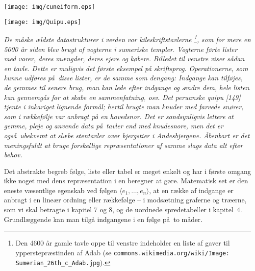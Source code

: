 \vspace*{-2.5cm}
\begin{minipage}{0.5\textwidth}
\begin{flushleft}
  \texttt{[image: img/cuneiform.eps]}
\end{flushleft}
\end{minipage}
\begin{minipage}{0.5\textwidth}
\begin{flushright}
\texttt{[image: img/Quipu.eps]} 
\end{flushright}
\end{minipage}
\vspace*{0.5cm}

\noindent
\emph{De måske ældste datastrukturer i verden var kileskriftstavlerne%
\footnote{%
Den 4600 år gamle tavle oppe til venstre indeholder en liste af gaver til ypperstepræstinden af Adab (se \texttt{commons.wikimedia.org/wiki/Image: Sumerian\_26th\_c\_Adab.jpg}).
},
som for mere en 5000 år siden blev brugt af vogterne i sumeriske templer.
Vogterne førte lister med varer, deres mængder, deres ejere og købere.
Billedet til venstre viser sådan en tavle.
Dette er muligvis det første eksempel på skriftsprog.
Operationerne, som kunne udføres på disse lister, er de samme som dengang:
Indgange kan tilføjes, de gemmes til senere brug, man kan lede efter indgange og ændre dem, hele listen kan gennemgås for at skabe en sammenfatning, osv.
Det peruanske quipu [149] tjente i inkariget lignende formål;
hertil brugte man knuder med farvede snører, som i rækkefølje var anbragt på en hovedsnor.
Det er sandsynligvis lettere at gemme, pleje og anvende data på tavler end med knudesnore, men det er også ubekvemt at slæbe stentavler over bjergstier i Andesbjergene.
Åbenbart er det meningsfuldt at bruge forskellige repræsentationer af samme slags data alt efter behov.
}

\bigskip\noindent
Det abstrakte begreb følge, liste eller tabel er meget enkelt og har i første omgang ikke noget med dens repræsentation i en beregner at gøre.
Matematisk set er den eneste væsentlige egenskab ved følgen $\langle e_1,\ldots, e_n\rangle$, at en række af indgange er anbragt i en lineær ordning eller rækkefølge -- i modsætning graferne og træerne, som vi skal betragte i kapitel 7 og 8, og de uordnede spredetabeller i kapitel~4.
Grundlæggende kan man tilgå indgangene i en følge på to måder.


